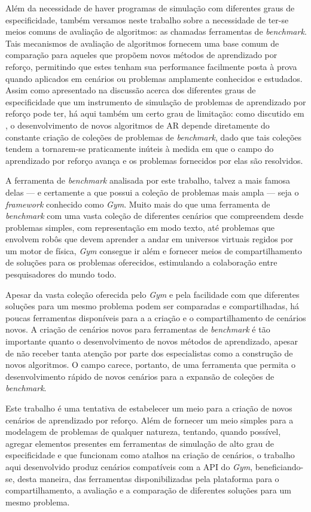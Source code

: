 \documentclass[cic,tc]{iiufrgs}
\begin{document}
Além da necessidade de haver programas de simulação com diferentes graus de
especificidade, também versamos neste trabalho sobre a necessidade de ter-se
meios comuns de avaliação de algoritmos: as chamadas ferramentas de
\textit{benchmark}. Tais mecanismos de avaliação de algoritmos fornecem uma base
comum de comparação para aqueles que propõem novos métodos de aprendizado por
reforço, permitindo que estes tenham sua performance facilmente posta à prova
quando aplicados em cenários ou problemas amplamente conhecidos e estudados.
Assim como apresentado na discussão acerca dos diferentes graus de
especificidade que um instrumento de simulação de problemas de aprendizado por
reforço pode ter, há aqui também um certo grau de limitação: como discutido em
\cite{Gym2016}, o desenvolvimento de novos algoritmos de AR depende diretamente do
constante criação de coleções de problemas de \textit{benchmark}, dado que tais
coleções tendem a tornarem-se praticamente inúteis à medida em que o campo do
aprendizado por reforço avança e os problemas fornecidos por elas são
resolvidos.


A ferramenta de \textit{benchmark} analisada por este trabalho, talvez
a mais famosa delas --- e certamente a que possui a coleção de problemas mais
ampla --- seja o \textit{framework} conhecido como \textit{Gym}. Muito mais do
que uma ferramenta de \textit{benchmark} com uma vasta coleção de diferentes
cenários que compreendem desde problemas simples, com representação em modo
texto, até problemas que envolvem robôs que devem aprender a andar em universos
virtuais regidos por um motor de física, \textit{Gym} consegue ir além e
fornecer meios de compartilhamento de soluções para os problemas oferecidos,
estimulando a colaboração entre pesquisadores do mundo todo.


Apesar da vasta coleção oferecida pelo \textit{Gym} e pela facilidade com que
diferentes soluções para um mesmo problema podem ser comparadas e
compartilhadas, há poucas ferramentas disponíveis para a a criação e o
compartilhamento de cenários novos. A criação de cenários novos para ferramentas
de \textit{benchmark} é tão importante quanto o desenvolvimento de novos métodos
de aprendizado, apesar de não receber tanta atenção por parte dos especialistas
como a construção de novos algoritmos. O campo carece, portanto, de uma
ferramenta que permita o desenvolvimento rápido de novos cenários para a
expansão de coleções de \textit{benchmark}.


Este trabalho é uma tentativa de estabelecer um meio para a criação de novos
cenários de aprendizado por reforço. Além de fornecer um meio simples para a
modelagem de problemas de qualquer natureza, tentando, quando possível, agregar
elementos presentes em ferramentas de simulação de alto grau de especificidade e
que funcionam como atalhos na criação de cenários, o trabalho aqui desenvolvido
produz cenários compatíveis com a API do \textit{Gym}, beneficiando-se, desta
maneira, das ferramentas disponibilizadas pela plataforma para o
compartilhamento, a avaliação e a comparação de diferentes soluções para um
mesmo problema.
\end{document}
